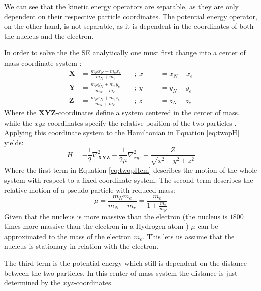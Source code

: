 \documentclass[../master_thesis.tex]{subfiles}
\begin{document}
We can see that the kinetic energy operators are separable, as they are only
dependent on their respective particle coordinates. The potential energy
operator, on the other hand, is not separable, as it is dependent in the
coordinates of both the nucleus and the electron.

In order to solve the the \ac{SE} analytically one must first change into a
center of mass coordinate system :
\begin{equation}
  \begin{aligned} \label{eq:cmparam}
    \mathbf{X} &= \frac{m_Nx_N + m_ex_e}{m_N + m_e} ~&&;~ x &&&= x_N - x_e \\
    \mathbf{Y} &= \frac{m_Ny_N + m_ey_e}{m_N + m_e} ~&&;~ y &&&= y_N - y_e \\
    \mathbf{Z} &= \frac{m_Nz_N + m_ez_e}{m_N + m_e} ~&&;~ z &&&= z_N - z_e
  \end{aligned}
\end{equation}
Where the $\mathbf{XYZ}$-coordinates define a system centered in the center of mass,
while the $xyz$-coordinates specify the relative position of the two particles
\cite{Jensen:2017}. Applying this coordinate system to the Hamiltonian in
Equation \ref{eq:twopH} yields:
\begin{equation}
  H = -\frac{1}{2}\nabla^2_{\mathbf{XYZ}} -\frac{1}{2\mu}\nabla^2_{xyz} -
  \frac{Z}{\sqrt{x^2 + y^2 + z^2}}\label{eq:twopHcm}
\end{equation}
Where the first term in Equation \ref{eq:twopHcm} describes the motion of the
whole system with respect to a fixed coordinate system. The second term
describes the relative motion of a pseudo-particle with reduced mass:
\begin{equation}
  \mu = \frac{m_Nm_e}{m_N + m_e} = \frac{m_e}{1 + \frac{m_e}{m_N}}
\end{equation}
Given that the nucleus is more massive than the electron (the nucleus is $1800$
times more massive than the electron in a Hydrogen atom \cite{Jensen:2017})
$\mu$ can be approximated to the mass of the electron $m_e$. This lets us
assume that the nucleus is stationary in relation with the electron.

The third term is the potential energy which still is dependent on the distance
between the two particles. In this center of mass system the distance is just
determined by the $xyz$-coordinates.
\end{document}
